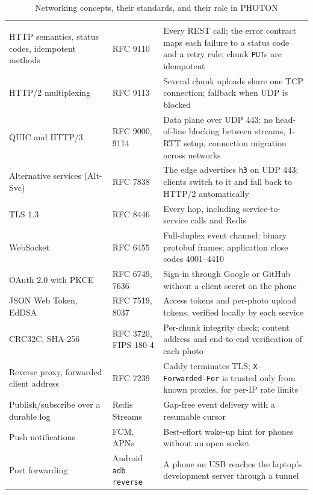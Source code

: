 \begin{table}[H]
\centering
\small\stripes
\begin{tabularx}{\linewidth}{L{3.4cm}L{2.9cm}Y}
\headrow {} &  & \\
HTTP semantics, status codes, idempotent methods & RFC 9110 & Every REST call; the error contract maps each failure to a status code and a retry rule; chunk \texttt{PUT}s are idempotent \\
HTTP/2 multiplexing & RFC 9113 & Several chunk uploads share one TCP connection; fallback when UDP is blocked \\
QUIC and HTTP/3 & RFC 9000, 9114 & Data plane over UDP 443: no head-of-line blocking between streams, 1-RTT setup, connection migration across networks \\
Alternative services (Alt-Svc) & RFC 7838 & The edge advertises \texttt{h3} on UDP 443; clients switch to it and fall back to HTTP/2 automatically \\
TLS 1.3 & RFC 8446 & Every hop, including service-to-service calls and Redis \\
WebSocket & RFC 6455 & Full-duplex event channel; binary protobuf frames; application close codes 4001--4410 \\
OAuth 2.0 with PKCE & RFC 6749, 7636 & Sign-in through Google or GitHub without a client secret on the phone \\
JSON Web Token, EdDSA & RFC 7519, 8037 & Access tokens and per-photo upload tokens, verified locally by each service \\
CRC32C, SHA-256 & RFC 3720, FIPS 180-4 & Per-chunk integrity check; content address and end-to-end verification of each photo \\
Reverse proxy, forwarded client address & RFC 7239 & Caddy terminates TLS; \texttt{X-Forwarded-For} is trusted only from known proxies, for per-IP rate limits \\
Publish/subscribe over a durable log & Redis Streams & Gap-free event delivery with a resumable cursor \\
Push notifications & FCM, APNs & Best-effort wake-up hint for phones without an open socket \\
Port forwarding & Android \texttt{adb reverse} & A phone on USB reaches the laptop's development server through a tunnel \\
\end{tabularx}
\caption{Networking concepts, their standards, and their role in PHOTON}\label{tab:concepts}
\end{table}

